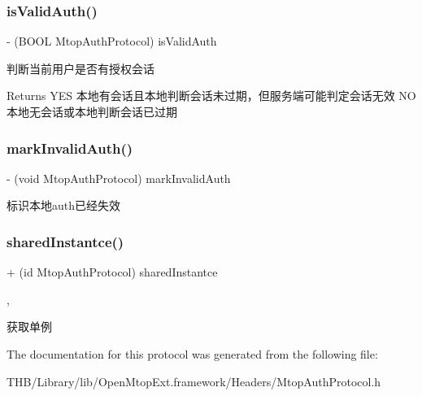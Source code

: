 \subsubsection{\texorpdfstring{is\+Valid\+Auth()}{isValidAuth()}}
{\footnotesize\ttfamily -\/ (B\+O\+OL Mtop\+Auth\+Protocol) is\+Valid\+Auth \begin{DoxyParamCaption}{ }\end{DoxyParamCaption}\hspace{0.3cm}{\ttfamily [required]}}

判断当前用户是否有授权会话 \begin{DoxyReturn}{Returns}
Y\+ES 本地有会话且本地判断会话未过期，但服务端可能判定会话无效 NO 本地无会话或本地判断会话已过期 
\end{DoxyReturn}
\mbox{\label{protocol_mtop_auth_protocol_01-p_ad6d38714fb89dd30fdfaef1c0b7dfae8}} 
\subsubsection{\texorpdfstring{mark\+Invalid\+Auth()}{markInvalidAuth()}}
{\footnotesize\ttfamily -\/ (void Mtop\+Auth\+Protocol) mark\+Invalid\+Auth \begin{DoxyParamCaption}{ }\end{DoxyParamCaption}\hspace{0.3cm}{\ttfamily [required]}}

标识本地auth已经失效 \mbox{\label{protocol_mtop_auth_protocol_01-p_a1e5ad2e5b6d6a7cc283efc86ef7eed81}} 
\subsubsection{\texorpdfstring{shared\+Instantce()}{sharedInstantce()}}
{\footnotesize\ttfamily + (id Mtop\+Auth\+Protocol) shared\+Instantce \begin{DoxyParamCaption}{ }\end{DoxyParamCaption}\hspace{0.3cm}{\ttfamily [static]}, {\ttfamily [required]}}

获取单例 

The documentation for this protocol was generated from the following file\+:\begin{DoxyCompactItemize}
\item 
T\+H\+B/\+Library/lib/\+Open\+Mtop\+Ext.\+framework/\+Headers/Mtop\+Auth\+Protocol.\+h\end{DoxyCompactItemize}
